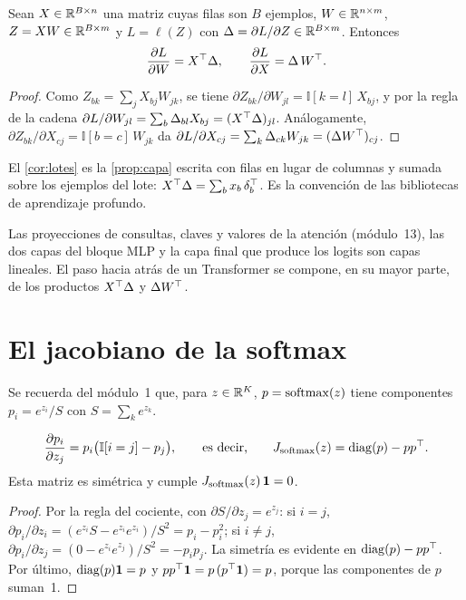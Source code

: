\begin{corolario}\label{cor:lotes}
Sean $X\in\mathbb{R}^{B\times n}$ una matriz cuyas filas son $B$ ejemplos, $W\in\mathbb{R}^{n\times m}$, $Z=XW\in\mathbb{R}^{B\times m}$ y $L=\ell(Z)$ con $\Delta=\partial L/\partial Z\in\mathbb{R}^{B\times m}$. Entonces
\[
\frac{\partial L}{\partial W}=X^{\top}\Delta,\qquad\frac{\partial L}{\partial X}=\Delta\,W^{\top}.
\]
\end{corolario}

\begin{proof}
Como $Z_{bk}=\sum_j X_{bj}W_{jk}$, se tiene $\partial Z_{bk}/\partial W_{jl}=\mathbb{I}[k=l]\,X_{bj}$, y por la regla de la cadena $\partial L/\partial W_{jl}=\sum_{b}\Delta_{bl}X_{bj}=(X^{\top}\Delta)_{jl}$. Análogamente, $\partial Z_{bk}/\partial X_{cj}=\mathbb{I}[b=c]\,W_{jk}$ da $\partial L/\partial X_{cj}=\sum_k\Delta_{ck}W_{jk}=(\Delta W^{\top})_{cj}$.
\end{proof}

El \cref{cor:lotes} es la \cref{prop:capa} escrita con filas en lugar de columnas y sumada sobre los ejemplos del lote: $X^{\top}\Delta=\sum_b x_b\,\delta_b^{\top}$. Es la convención de las bibliotecas de aprendizaje profundo.

\begin{observacion}
Las proyecciones de consultas, claves y valores de la atención (módulo~13), las dos capas del bloque MLP y la capa final que produce los logits son capas lineales. El paso hacia atrás de un Transformer se compone, en su mayor parte, de los productos $X^{\top}\Delta$ y $\Delta W^{\top}$.
\end{observacion}

\section{El jacobiano de la softmax}

Se recuerda del módulo~1 que, para $z\in\mathbb{R}^{K}$, $p=\operatorname{softmax}(z)$ tiene componentes $p_i=e^{z_i}/S$ con $S=\sum_k e^{z_k}$.

\begin{proposicion}\label{prop:jac-softmax}
\[
\frac{\partial p_i}{\partial z_j}=p_i\bigl(\mathbb{I}[i=j]-p_j\bigr),\qquad\text{es decir,}\qquad J_{\operatorname{softmax}}(z)=\operatorname{diag}(p)-pp^{\top}.
\]
Esta matriz es simétrica y cumple $J_{\operatorname{softmax}}(z)\,\mathbf{1}=0$.
\end{proposicion}

\begin{proof}
Por la regla del cociente, con $\partial S/\partial z_j=e^{z_j}$: si $i=j$, $\partial p_i/\partial z_i=(e^{z_i}S-e^{z_i}e^{z_i})/S^{2}=p_i-p_i^{2}$; si $i\ne j$, $\partial p_i/\partial z_j=(0-e^{z_i}e^{z_j})/S^{2}=-p_ip_j$. La simetría es evidente en $\operatorname{diag}(p)-pp^{\top}$. Por último, $\operatorname{diag}(p)\mathbf{1}=p$ y $pp^{\top}\mathbf{1}=p\,(p^{\top}\mathbf{1})=p$, porque las componentes de $p$ suman~1.
\end{proof}

